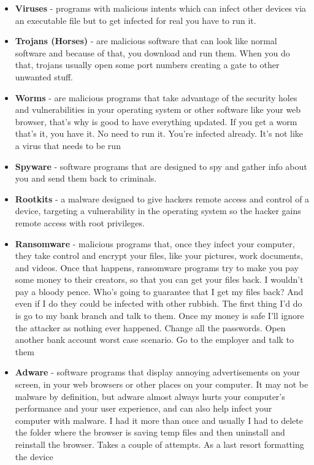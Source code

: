 \documentclass[a4paper,12pt]{book}
\begin{document}
\begin{itemize}
\item{\textbf{Viruses} - programs with malicious intents which can infect other devices via an executable file but to get infected for real you have to run it.}
\item{\textbf{Trojans (Horses)} - are malicious software that can look like normal software and because of that, you download and run them. When you do that, trojans usually open some port numbers creating a gate to other unwanted stuff.}
\item{\textbf{Worms} - are malicious programs that take advantage of the security holes and vulnerabilities in your operating system or other software like your web browser, that's why is good to have everything updated. If you get a worm that's it, you have it. No need to run it. You're infected already. It's not like a virus that needs to be run}
\item{\textbf{Spyware} - software programs that are designed to spy and gather info about you and send them back to criminals.}
\item{\textbf{Rootkits} - a malware designed to give hackers remote access and control of a device, targeting a vulnerability in the operating system so the hacker gains remote access with root privileges.}
\item{\textbf{Ransomware} - malicious programs that, once they infect your computer, they take control and encrypt your files, like your pictures, work documents, and videos. Once that happens, ransomware programs try to make you pay some money to their creators, so that you can get your files back. I wouldn't pay a bloody pence. Who's going to guarantee that I get my files back? And even if I do they could be infected with other rubbish. The first thing I'd do is go to my bank branch and talk to them. Once my money is safe I'll ignore the attacker as nothing ever happened. Change all the passwords. Open another bank account worst case scenario. Go to the employer and talk to them}
\item{\textbf{Adware} - software programs that display annoying advertisements on your screen, in your web browsers or other places on your computer. It may not be malware by definition, but adware almost always hurts your computer's performance and your user experience, and can also help infect your computer with malware. I had it more than once and usually I had to delete the folder where the browser is saving temp files and then uninstall and reinstall the browser. Takes a couple of attempts. As a last resort formatting the device}

\end{itemize}
\end{document}
